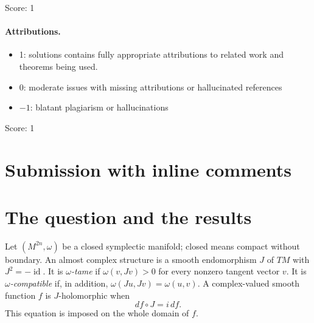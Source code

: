 \documentclass[11pt]{article}
\theoremstyle{definition}
\theoremstyle{remark}
\newcommand{\id}{\operatorname{id}}
\begin{document}
\noindent Score: 1

\paragraph{Attributions.}
\begin{itemize}
	\item  1: solutions contains fully appropriate attributions
		to related work and theorems being used.
	\item  0: moderate issues with missing attributions or hallucinated references
	\item  $-1$: blatant plagiarism or hallucinations
\end{itemize}

\noindent Score: 1

\newpage
\section{Submission with inline comments}


\begin{abstract}
We study whether a symplectic simple normal crossings divisor admits local holomorphic defining coordinates for one tame almost complex structure, after a cohomologous symplectic deformation preserving the divisor. We prove the assertion in real dimension at most four, and for smooth divisors in dimension six. For a smooth divisor in any dimension we give an equivalent condition on holomorphic transition functions of its normal line. An explicit local example shows that invariance of the divisor and vanishing of the Nijenhuis tensor along it do not suffice for a prescribed almost complex structure. We also prove a conditional construction in arbitrary dimension from a finite collection of auxiliary divisors and compatible normal-bundle data. The realization of the full input to that construction is not established here; the unrestricted existence question remains unresolved in this paper.
\end{abstract}

\section{The question and the results}

Let $(M^{2n},\omega)$ be a closed symplectic manifold; closed means compact without boundary. An almost complex structure is a smooth endomorphism $J$ of $TM$ with $J^2=-\id$. It is \emph{$\omega$-tame} if $\omega(v,Jv)>0$ for every nonzero tangent vector $v$. It is \emph{$\omega$-compatible} if, in addition, $\omega(Ju,Jv)=\omega(u,v)$. A complex-valued smooth function $f$ is $J$-holomorphic when
\begin{equation}\label{eq:holomorphic}
 df\circ J=i\,df.
\end{equation}
This equation is imposed on the whole domain of $f$.
\end{document}
